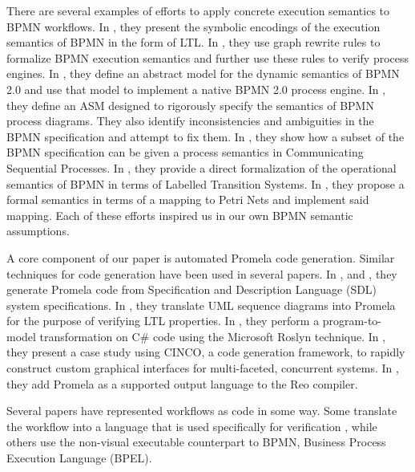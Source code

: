 There are several examples of efforts to apply concrete execution semantics to BPMN workflows. In \cite{BPMNExecutionSemantics1}, they present the symbolic encodings of the execution semantics of BPMN in the form of LTL. In \cite{BPMNExecutionSemantics2}, they use graph rewrite rules to formalize BPMN execution semantics and further use these rules to verify process engines. In \cite{BPMNExecutionSemantics3}, they define an abstract model for the dynamic semantics of BPMN 2.0 and use that model to implement a native BPMN 2.0 process engine. In \cite{BPMNExecutionSemantics4}, they define an ASM designed to rigorously specify the semantics of BPMN process diagrams. They also identify inconsistencies and ambiguities in the BPMN specification and attempt to fix them. In \cite{BPMNExecutionSemantics5}, they show how a subset of the BPMN specification can be given a process semantics in Communicating Sequential Processes. In \cite{BPMNExecutionSemantics6}, they provide a direct formalization of the operational semantics of BPMN in terms of Labelled Transition Systems. In \cite{BPMNExecutionSemantics7}, they propose a formal semantics in terms of a mapping to Petri Nets and implement said mapping. Each of these efforts inspired us in our own BPMN semantic assumptions.

A core component of our paper is automated Promela code generation. Similar techniques for code generation have been used in several papers. In \cite{promelaGeneration1}, \cite{promelaGeneration2} and \cite{promelaGeneration3}, they generate Promela code from Specification and Description Language (SDL) system specifications. In \cite{promelaGeneration4}, they translate UML sequence diagrams into Promela for the purpose of verifying LTL properties. In \cite{promelaGeneration5}, they perform a program-to-model transformation on C# code using the Microsoft Roslyn technique. In \cite{promelaGeneration6}, they present a case study using CINCO, a code generation framework, to rapidly construct custom graphical interfaces for multi-faceted, concurrent systems. In \cite{promelaGeneration7}, they add Promela as a supported output language to the Reo compiler.

Several papers have represented workflows as code in some way.  Some translate the workflow into a language that is used specifically for verification \cite{codeBasedModel1} \cite{codeBasedModel2}, while others use the non-visual executable counterpart to BPMN, Business Process Execution Language (BPEL). \cite{BPEL} \cite{codeBasedModel3} \cite{codeBasedModel4}

